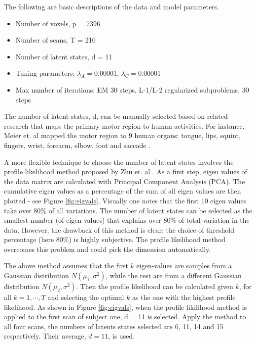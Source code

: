 \documentclass[fleqn]{article}
\let\oldref\ref
\renewcommand{\ref}[1]{(\oldref{#1})}
\begin{document}
The following are basic descriptions of the data and model parameters.
\begin{itemize}[noitemsep, topsep=0pt]
\item Number of voxels, p = 7396
\item Number of scans, T = 210
\item Number of latent states, d = 11
\item Tuning parameters: $\lambda_A = 0.00001$, $\lambda_C = 0.00001$
\item Max number of iterations: EM 30 steps, L-1/L-2 regularized subproblems, 30 steps
\end{itemize}

The number of latent states, d, can be manually selected based on related research that maps the primary motor region to human activities. For instance, Meier et. al mapped the motor region to 9 human organs: tongue, lips, squint, fingers, wrist, forearm, elbow, foot and saccade \cite{meier2008complex}.

A more flexible technique to choose the number of latent states involves the profile likelihood method proposed by Zhu et. al \cite{zhu2006automatic}. As a first step, eigen values of the data matrix are calculated with Principal Component Analysis (PCA). The cumulative eigen values as a percentage of the sum of all eigen values are then plotted - see Figure \oldref{fig:eigvals}. Visually one notes that the first 10 eigen values take over $80\%$ of all variations. The number of latent states can be selected as the smallest number (of eigen values) that explains over $80\%$ of total variation in the data. However, the drawback of this method is clear: the choice of threshold percentage (here $80\%$) is highly subjective. The profile likelihood method overcomes this problem and could pick the dimension automatically.

The above method assumes that the first $k$ eigen-values are samples from a Gaussian distribution $N(\mu_1,\sigma^2)$, while the rest are from a different Gaussian distribution $N(\mu_2,\sigma^2)$. Then the profile likelihood can be calculated given $k$, for all $k=1,\cdots,T$ and selecting the optimal $k$ as the one with the highest profile likelihood. As shown in Figure \oldref{fig:eigvals}, when the profile likilihood method is applied to the first scan of subject one, d = 11 is selected. Apply the method to all four scans, the numbers of latents states selected are 6, 11, 14 and 15 respectively. Their average, $d=11$, is used.
\end{document}
